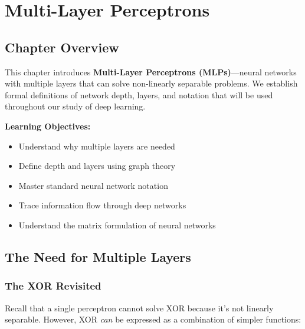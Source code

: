 
\chapter{Multi-Layer Perceptrons}
\label{ch:mlp}


\section{Chapter Overview}

This chapter introduces \textbf{Multi-Layer Perceptrons (MLPs)}---neural networks with multiple layers that can solve non-linearly separable problems. We establish formal definitions of network depth, layers, and notation that will be used throughout our study of deep learning.

\textbf{Learning Objectives:}
\begin{itemize}
    \item Understand why multiple layers are needed
    \item Define depth and layers using graph theory
    \item Master standard neural network notation
    \item Trace information flow through deep networks
    \item Understand the matrix formulation of neural networks
\end{itemize}


\section{The Need for Multiple Layers}

\subsection{The XOR Revisited}

Recall that a single perceptron cannot solve XOR because it's not linearly separable. However, XOR \textit{can} be expressed as a combination of simpler functions:

